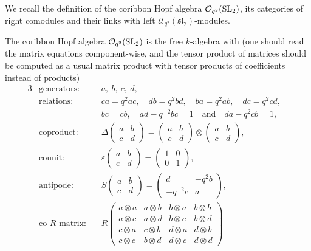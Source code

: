 \documentclass[pdftex]{sigma}%
\numberwithin{equation}{section}
\newcommand{\Oq}{\mathcal{O}_{q^2}({\rm SL}_2)}
\newcommand{\Uq}{\mathcal{U}_{q^2}(\mathfrak{sl}_2)}
\begin{document}
We recall the definition of the coribbon Hopf algebra $\Oq$, its categories of right comodules and their links with left $\Uq$-modules.
\begin{Definition}
The coribbon Hopf algebra $\Oq$ is the free $k$-algebra with
(one should read the matrix equations component-wise, and the tensor product of matrices should be computed as a usual matrix product with tensor products of coefficients instead of products)
\begin{alignat*}{3}
& \text{generators}\colon&& a,\ b,\ c,\ d,&
\\
& \text{relations}\colon&& ca = q^2ac,\quad db = q^2bd,\quad ba = q^2ab,\quad dc = q^2cd,&
\\
&&& bc = cb,\quad ad - q^{-2}bc = 1\quad \text{and}\quad da - q^2cb = 1,&
\\
&\text{coproduct}\colon&&\Delta\begin{pmatrix} a & b \\[-.5ex] c & d \end{pmatrix}
= \begin{pmatrix} a & b \\[-.5ex] c & d \end{pmatrix} \otimes \begin{pmatrix} a & b \\[-.5ex] c & d \end{pmatrix}\!,&
\\
& \text{counit}\colon&& \varepsilon \begin{pmatrix} a & b \\[-.5ex] c & d \end{pmatrix}
= \begin{pmatrix} 1& 0 \\[-.5ex] 0 & 1\end{pmatrix}\!,&
\\
& \text{antipode}\colon&& S \begin{pmatrix} a & b \\[-.5ex] c & d \end{pmatrix}
= \begin{pmatrix} d & -q^2b \\[-.5ex] -q^{-2}c & a \end{pmatrix}\!,&
\\
&\text{co-}R\text{-matrix}\colon&& R \begin{pmatrix}
a \otimes a & a \otimes b & b \otimes a & b \otimes b
\\
a \otimes c & a \otimes d & b \otimes c & b\otimes d\\ c\otimes a & c\otimes b & d \otimes a & d\otimes b\\ c\otimes c & b\otimes d & d\otimes c & d\otimes d \end{pmatrix}

\end{alignat*}
\end{Definition}
\end{document}
